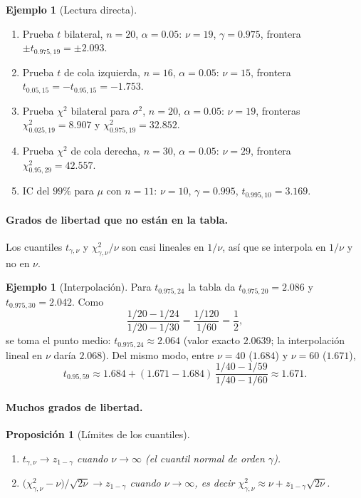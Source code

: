 \documentclass[11pt]{article}
\theoremstyle{plain}
\newtheorem{proposition}[theorem]{Proposición}
\theoremstyle{definition}
\newtheorem{example}[theorem]{Ejemplo}
\theoremstyle{remark}
\theoremstyle{solstyle}
\newcommand{\1}{\mathbbm{1}}
\begin{document}
\begin{example}[Lectura directa]
\begin{enumerate}[label=(\alph*),leftmargin=2em]
\item Prueba $t$ bilateral, $n=20$, $\alpha=0.05$: $\nu=19$, $\gamma=0.975$, frontera $\pm t_{0.975,19}=\pm 2.093$.
\item Prueba $t$ de cola izquierda, $n=16$, $\alpha=0.05$: $\nu=15$, frontera $t_{0.05,15}=-t_{0.95,15}=-1.753$.
\item Prueba $\chi^2$ bilateral para $\sigma^2$, $n=20$, $\alpha=0.05$: $\nu=19$, fronteras $\chi^2_{0.025,19}=8.907$ y $\chi^2_{0.975,19}=32.852$.
\item Prueba $\chi^2$ de cola derecha, $n=30$, $\alpha=0.05$: $\nu=29$, frontera $\chi^2_{0.95,29}=42.557$.
\item IC del $99\%$ para $\mu$ con $n=11$: $\nu=10$, $\gamma=0.995$, $t_{0.995,10}=3.169$.
\end{enumerate}
\end{example}

\paragraph{Grados de libertad que no están en la tabla.} Los cuantiles $t_{\gamma,\nu}$ y $\chi^2_{\gamma,\nu}/\nu$ son casi lineales en $1/\nu$, así que se interpola en $1/\nu$ y no en $\nu$.

\begin{example}[Interpolación]
Para $t_{0.975,24}$ la tabla da $t_{0.975,20}=2.086$ y $t_{0.975,30}=2.042$. Como
\[
\frac{1/20-1/24}{1/20-1/30}=\frac{1/120}{1/60}=\frac12,
\]
se toma el punto medio: $t_{0.975,24}\approx 2.064$ (valor exacto $2.0639$; la interpolación lineal en $\nu$ daría $2.068$). Del mismo modo, entre $\nu=40$ ($1.684$) y $\nu=60$ ($1.671$),
\[
t_{0.95,59}\approx 1.684+(1.671-1.684)\,\frac{1/40-1/59}{1/40-1/60}\approx 1.671 .
\]
\end{example}

\paragraph{Muchos grados de libertad.}
\begin{proposition}[Límites de los cuantiles]\label{prop:quantlim}
\begin{enumerate}[label=(\roman*),leftmargin=2em]
\item $t_{\gamma,\nu}\to z_{1-\gamma}$ cuando $\nu\to\infty$ (el cuantil normal de orden $\gamma$).
\item $\bigl(\chi^2_{\gamma,\nu}-\nu\bigr)/\sqrt{2\nu}\to z_{1-\gamma}$ cuando $\nu\to\infty$, es decir $\chi^2_{\gamma,\nu}\approx \nu+z_{1-\gamma}\sqrt{2\nu}$.
\end{enumerate}
\end{proposition}
\end{document}

